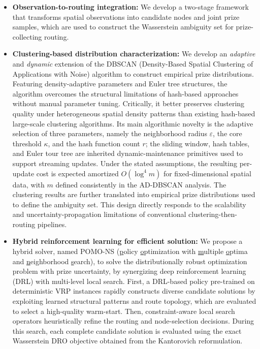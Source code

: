 \documentclass[preprint,12pt,authoryear]{elsarticle}
\theoremstyle{definition}
\begin{document}
\begin{itemize} 
\item \textbf{Observation-to-routing integration:} We develop a two-stage framework that transforms spatial observations into candidate nodes and joint prize samples, which are used to construct the Wasserstein ambiguity set for prize-collecting routing.

\item \textbf{Clustering-based distribution characterization:} We develop an {\it adaptive} and {\it dynamic} extension of the DBSCAN (Density-Based Spatial Clustering of Applications with Noise) algorithm to construct empirical prize distributions. Featuring density-adaptive parameters and Euler tree structures, the algorithm overcomes the structural limitations of hash-based approaches without manual parameter tuning. Critically,  it better preserves clustering quality under heterogeneous spatial density patterns than existing hash-based large-scale clustering algorithms. Its main algorithmic novelty is the adaptive selection of three parameters, namely the neighborhood radius $\varepsilon$, the core threshold $\kappa$, and the hash function count $r$; the sliding window, hash tables, and Euler tour tree are inherited dynamic-maintenance primitives used to support streaming updates. Under the stated assumptions, the resulting per-update cost is expected amortized $O(\log^4 m)$ for fixed-dimensional spatial data, with $m$ defined consistently in the AD-DBSCAN analysis. The clustering results are further translated into empirical prize distributions used to define the ambiguity set. This design directly responds to the scalability and uncertainty-propagation limitations of conventional clustering-then-routing pipelines.


\item \textbf{Hybrid reinforcement learning for efficient solution:} We propose a hybrid solver, named POMO-NS (\underline{p}olicy \underline{o}ptimization with \underline{m}ultiple \underline{o}ptima and \underline{n}eighborhood \underline{s}earch), to solve the distributionally robust optimization problem with prize uncertainty, by synergizing deep reinforcement learning (DRL) with multi-level local search. First, a DRL-based policy pre-trained on deterministic VRP instances rapidly constructs diverse candidate solutions by exploiting learned structural patterns and route topology, which are evaluated to select a high-quality warm-start. Then, constraint-aware local search operators heuristically refine the routing and node-selection decisions. During this search, each complete candidate solution is evaluated using the exact Wasserstein DRO objective obtained from the Kantorovich reformulation. 
\end{itemize}
\end{document}
